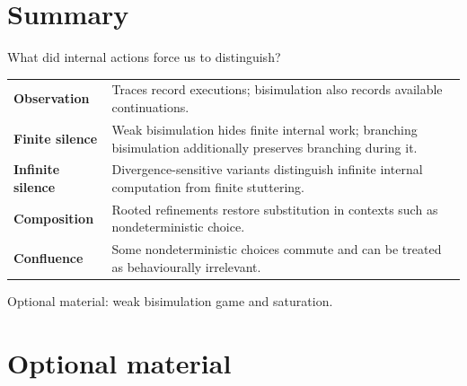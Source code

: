 \documentclass[handout,aspectratio=169,11pt]{beamer}
\begin{document}
\section{Summary}

\begin{frame}{What did internal actions force us to distinguish?}
  \renewcommand{\arraystretch}{1.4}
  \begin{tabular}{@{}p{}p{}@{}}
    \textbf{Observation}
      & Traces record executions; bisimulation also records available
        continuations.\\

    \textbf{Finite silence}
      & Weak bisimulation hides finite internal work; branching
        bisimulation additionally preserves branching during it.\\

    \textbf{Infinite silence}
      & Divergence-sensitive variants distinguish infinite internal
        computation from finite stuttering.\\

    \textbf{Composition}
      & Rooted refinements restore substitution in contexts such as
        nondeterministic choice.\\

    \textbf{Confluence}
      & Some nondeterministic choices commute and can be treated as
        behaviourally irrelevant.\\
  \end{tabular}

  \vspace{3mm}



\end{frame}














\begin{frame}

  \begin{center}
{\huge Optional material: weak bisimulation game and saturation.}
    
  \end{center}

\end{frame}
\section{Optional material}
\end{document}
